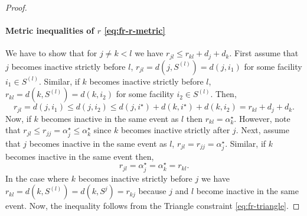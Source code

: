 \begin{proof}
\paragraph{Metric inequalities of $r$ \eqref{eq:fr-r-metric}}
We have to show that for $j \neq k < l$ we have $r_{jl} \le r_{kl} + d_j + d_k$. First assume that $j$ becomes inactive strictly before $l$, $r_{jl} = d(j, S^{(l)}) = d(j,i_1)$ for some facility $i_1 \in S^{(l)}$. Similar, if $k$ becomes inactive strictly before $l$, $r_{kl} = d(k, S^{(l)}) = d(k,i_2)$ for some facility $i_2 \in S^{(l)}$. Then,
\[
    r_{jl} = d(j,i_1) \le d(j,i_2) \le d(j,i^\star) + d(k, i^\star) + d(k,i_2) = r_{kl} + d_j + d_k.
\]
Now, if $k$ becomes inactive in the same event as $l$ then $r_{kl} = \alpha^\star_k$. However, note that $r_{jl} \le r_{jj} = \alpha^\star_j \le \alpha^\star_{k}$ since $k$ becomes inactive strictly after $j$.
\newline Next, assume that $j$ becomes inactive in the same event as $l$, $r_{jl} = r_{jj} = \alpha^\star_j$. Similar, if $k$ becomes inactive in the same event then,
\[
    r_{jl} = \alpha^\star_j = \alpha^\star_k = r_{kl}.
\]
In the case where $k$ becomes inactive strictly before $j$ we have $r_{kl} = d(k, S^{(l)}) = d(k,S^{j}) = r_{kj}$ because $j$ and $l$ become inactive in the same event. Now, the inequality follows from the Triangle constraint \eqref{eq:fr-triangle}. 

\end{proof}

